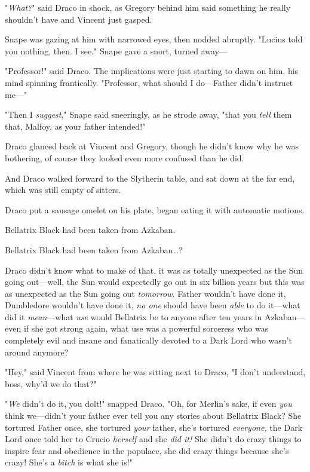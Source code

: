 "\emph{What?}" said Draco in shock, as Gregory behind him said something he 
really shouldn't have and Vincent just gasped.

Snape was gazing at him with narrowed eyes, then nodded abruptly. "Lucius told 
you nothing, then. I see." Snape gave a snort, turned away---

"Professor!" said Draco. The implications were just starting to dawn on him, 
his mind spinning frantically. "Professor, what should I do---Father didn't 
instruct me---"

"Then I \emph{suggest}," Snape said sneeringly, as he strode away, "that you 
\emph{tell} them that, Malfoy, as your father intended!"

Draco glanced back at Vincent and Gregory, though he didn't know why he was 
bothering, of course they looked even more confused than he did.

And Draco walked forward to the Slytherin table, and sat down at the far end, 
which was still empty of sitters.

Draco put a sausage omelet on his plate, began eating it with automatic motions.

Bellatrix Black had been taken from Azkaban.

Bellatrix Black had been taken from Azkaban{\ldots}?

Draco didn't know what to make of that, it was as totally unexpected as the Sun 
going out---well, the Sun would expectedly go out in six billion years but this 
was as unexpected as the Sun going out \emph{tomorrow}. Father wouldn't have 
done it, Dumbledore wouldn't have done it, \emph{no one} should have been 
\emph{able} to do it---what did it \emph{mean}---what \emph{use} would 
Bellatrix be to anyone after ten years in Azkaban---even if she got strong 
again, what use was a powerful sorceress who was completely evil and insane and 
fanatically devoted to a Dark Lord who wasn't around anymore?

"Hey," said Vincent from where he was sitting next to Draco, "I don't 
understand, boss, why'd we do that?"

"\emph{We} didn't do it, you dolt!" snapped Draco. "Oh, for Merlin's sake, if 
even \emph{you} think we---didn't your father ever tell you any stories about 
Bellatrix Black? She tortured Father once, she tortured \emph{your} father, 
she's tortured \emph{everyone,} the Dark Lord once told her to Crucio 
\emph{herself} and she \emph{did it!} She didn't do crazy things to inspire 
fear and obedience in the populace, she did crazy things because she's crazy! 
She's a \emph{bitch} is what she is!"

